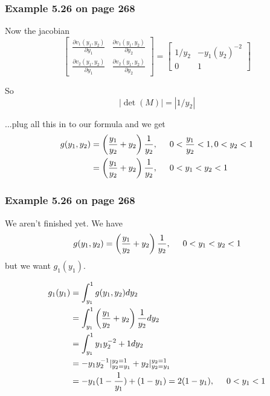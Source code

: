 \documentclass{beamer}
\begin{document}
\begin{frame}
\frametitle{Example 5.26 on page 268}

Now the jacobian
\[
\left[ \begin{array}{cc}
\frac{\partial v_1(y_1, y_2)}{\partial y_1} & \frac{\partial v_1(y_1, y_2)}{\partial y_2} \\
\frac{\partial v_2(y_1, y_2)}{\partial y_1} & \frac{\partial v_2(y_1, y_2)}{\partial y_2}  \end{array} \right]
=
\left[ \begin{array}{cc}
1/y_2 & -y_1(y_2)^{-2} \\
0 & 1 \end{array} \right]
\]

So
\[
|\operatorname{det}(M)| = |1/y_2|
\]

...plug all this in to our formula and we get
\begin{align*}
g(y_1,y_2) &= \left( \frac{y_1}{y_2} + y_2 \right) \frac{1}{y_2}, \hspace{5mm} 0 < \frac{y_1}{y_2} < 1, 0 < y_2 < 1 \\
&= \left( \frac{y_1}{y_2} + y_2 \right) \frac{1}{y_2}, \hspace{5mm} 0 < y_1 < y_2 < 1 
\end{align*}

\end{frame}
\begin{frame}
\frametitle{Example 5.26 on page 268}

We aren't finished yet. We have
\[
g(y_1,y_2) = \left( \frac{y_1}{y_2} + y_2 \right) \frac{1}{y_2}, \hspace{5mm} 0 < y_1 < y_2 < 1 
\]
but we want $g_1(y_1)$.

\begin{align*}
g_1(y_1) &= \int_{y_1}^1 g(y_1, y_2) dy_2 \\
&= \int_{y_1}^1 \left( \frac{y_1}{y_2} + y_2 \right) \frac{1}{y_2} dy_2 \\
&= \int_{y_1}^1 y_1 y_2^{-2} + 1 dy_2 \\
&= -y_1y_2^{-1}|_{y_2 = y_1}^{y_2 = 1} + y_2|_{y_2 = y_1}^{y_2 = 1}\\
&= -y_1(1 - \frac{1}{y_1}) + (1-y_1) = 2(1-y_1), \hspace{5mm} 0 < y_1 < 1
\end{align*}
\end{frame}
\end{document}
